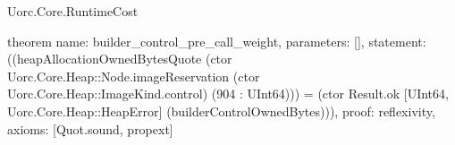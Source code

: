 \begin{lexlean}{Uorc.Core.RuntimeCost}
\begin{semanticmodule}
theorem{
  name: builder_control_pre_call_weight,
  parameters: [],
  statement: ((heapAllocationOwnedBytesQuote (ctor Uorc.Core.Heap::Node.imageReservation (ctor Uorc.Core.Heap::ImageKind.control) (904 : UInt64))) = (ctor Result.ok [UInt64, Uorc.Core.Heap::HeapError] (builderControlOwnedBytes))),
  proof: reflexivity{},
  axioms: [Quot.sound, propext]
}
\end{semanticmodule}
\end{lexlean}
